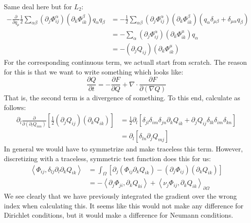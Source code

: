 \documentclass[reqno]{article}
\begin{document}
Same deal here but for $L_2$:
\begin{equation}
\begin{split}
    -\frac{\partial}{\partial q_\mu} 
    \frac12 \sum_{\alpha \beta} \left(\partial_j \Phi^\alpha_{ij} \right) \left(\partial_k \Phi^\beta_{ik} \right) q_\alpha q_\beta
    &=
    - \frac12 \sum_{\alpha \beta} \left(\partial_j \Phi^\alpha_{ij} \right) \left(\partial_k \Phi^\beta_{ik} \right) 
    \left(
        q_\alpha \delta_{\mu \beta}
        + \delta_{\mu \alpha} q_\beta
    \right) \\
    &=
    - \sum_\alpha \left(\partial_j \Phi^\alpha_{ij} \right) \left(\partial_k \Phi^\mu_{ik} \right) q_\alpha \\
    &=
    -\left( \partial_j Q_{ij} \right) \left( \partial_k \Phi^\mu_{ik} \right)
\end{split}
\end{equation}
For the corresponding continuous term, we actuall start from scratch.
The reason for this is that we want to write something which looks like:
\begin{equation}
    \frac{\partial Q}{\partial t}
    =
    -\frac{\partial F}{\partial Q}
    + \nabla \cdot \frac{\partial F}{\partial \left( \nabla Q \right)}
\end{equation}
That is, the second term is a divergence of something.
To this end, calculate as follows:
\begin{equation}
\begin{split}
    \partial_l \frac{\partial}{\partial \left(\partial_l Q_{mn}\right)}
    \left[
        \frac12 \left(\partial_j Q_{ij} \right) \left( \partial_k Q_{ik} \right)
    \right]
    &=
    \frac12 \partial_l \left[
        \delta_{jl} \delta_{im} \delta_{jn} \partial_k Q_{ik}
        + \partial_j Q_{ij} \delta_{lk} \delta_{im} \delta_{kn}
    \right] \\
    &=
    \partial_l \left[
        \delta_{ln} \partial_j Q_{mj}
    \right]
\end{split}
\end{equation}
In general we would have to symmetrize and make traceless this term.
However, discretizing with a traceless, symmetric test function does this for us:
\begin{equation}
\begin{split}
    \left< \Phi_{ij}, \delta_{lj} \partial_l \partial_k Q_{ik} \right>
    &=
    \int_\Omega \left[
        \partial_j \left(\Phi_{ij} \partial_k Q_{ik}\right)
        - \left( \partial_j \Phi_{ij} \right) \left( \partial_k Q_{ik} \right)
    \right] \\
    &=
    -\left< \partial_j \Phi_{ji}, \partial_k Q_{ki} \right>
    + \left< \nu_j \Phi_{ij}, \partial_k Q_{ik} \right>_{\partial \Omega}
\end{split}
\end{equation}
We see clearly that we have previously integrated the gradient over the wrong index when calculating this.
It seems like this would not make any difference for Dirichlet conditions, but it would make a difference for Neumann conditions.
\end{document}
